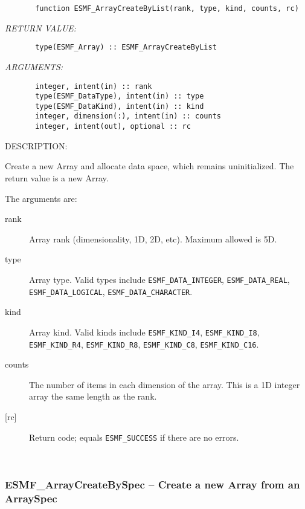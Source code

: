 \begin{verbatim}       function ESMF_ArrayCreateByList(rank, type, kind, counts, rc)\end{verbatim}{\em RETURN VALUE:}
\begin{verbatim}       type(ESMF_Array) :: ESMF_ArrayCreateByList\end{verbatim}{\em ARGUMENTS:}
\begin{verbatim}       integer, intent(in) :: rank
       type(ESMF_DataType), intent(in) :: type
       type(ESMF_DataKind), intent(in) :: kind
       integer, dimension(:), intent(in) :: counts
       integer, intent(out), optional :: rc\end{verbatim}
{\sf DESCRIPTION:\\ }


   Create a new Array and allocate data space, which remains uninitialized.
   The return value is a new Array.
  
   The arguments are:
   \begin{description}
  
   \item[rank]
   Array rank (dimensionality, 1D, 2D, etc). Maximum allowed is 5D.
  
   \item[type]
   Array type. Valid types include {\tt ESMF\_DATA\_INTEGER},
   {\tt ESMF\_DATA\_REAL}, {\tt ESMF\_DATA\_LOGICAL},
   {\tt ESMF\_DATA\_CHARACTER}.
  
   \item[kind]
   Array kind. Valid kinds include {\tt ESMF\_KIND\_I4},
   {\tt ESMF\_KIND\_I8}, {\tt ESMF\_KIND\_R4}, {\tt ESMF\_KIND\_R8},
   {\tt ESMF\_KIND\_C8}, {\tt ESMF\_KIND\_C16}.
  
   \item[counts]
   The number of items in each dimension of the array. This is a 1D
   integer array the same length as the rank.
  
   \item[{[rc]}]
   Return code; equals {\tt ESMF\_SUCCESS} if there are no errors.
  
   \end{description}
   
 
\mbox{}\hrulefill\ 
 
\subsubsection [ESMF\_ArrayCreateBySpec] {ESMF\_ArrayCreateBySpec -- Create a new Array from an ArraySpec}



